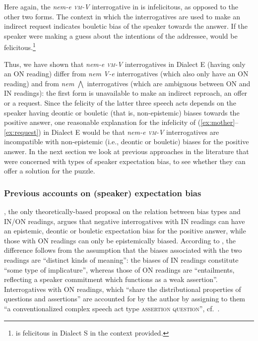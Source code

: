 \documentclass[output=paper,colorlinks,citecolor=brown]{langscibook}
\begin{document}
	\noindent Here again, the \textit{nem-e \textsc{vm}-V} interrogative in  is infelicitous, as opposed to the other two forms. The context in which the interrogatives are used to make an indirect request indicates bouletic bias of the speaker towards the  answer. If the speaker were making a guess about the intentions of the addressee,  would be felicitous.\footnote{ is felicitous in Dialect S in the context provided.} 

	
	Thus, we have shown that \textit{nem-e \textsc{vm}-V} interrogatives in Dialect E (having only an ON reading) differ from  \textit{nem V-e} interrogatives (which also only have an ON reading) and from \textit{nem  $\bigwedge$} interrogatives (which are ambiguous between ON and IN readings): the first form is unavailable to make an indirect reproach, an offer or a request. Since the felicity of the latter three speech acts depends on the speaker having deontic or bouletic (that is, non-epistemic) biases towards the positive answer, one reasonable explanation for 
	the infelicity of (\ref{ex:mother}--\ref{ex:request})  in Dialect E would be that \textit{nem-e \textsc{vm}-V} interrogatives are incompatible with non-epistemic (i.e., deontic or bouletic) biases for the positive answer. In the next section  we look at previous approaches in the literature that were concerned with types of speaker expectation bias, to see whether they can offer a solution for the puzzle.
	
	
\subsubsection{Previous accounts on (speaker) expectation bias}
	

	\citet{Reese2007}, the only theoretically-based proposal on the relation between bias types and IN/ON readings, argues that negative interrogatives with IN readings can have an epistemic, deontic or bouletic expectation bias for the positive answer, while those with ON readings can only be epistemically biased. According to \citet[91]{Reese2007}, the difference follows from the assumption that the biases associated with the two readings are ``distinct kinds of meaning'': the biases of IN readings constitute ``some type of implicature'', whereas those of ON readings are ``entailments, reflecting a speaker commitment which functions as a weak assertion''. Interrogatives with ON readings, which  ``share the distributional properties of questions and assertions'' are accounted for by the author by assigning to them ``a conventionalized complex speech act type \textsc{assertion} \textbullet {} \textsc{question}'', cf.~\citet{asher+lascarides2001, asher+lascarides2003}. 
	
\end{document}
